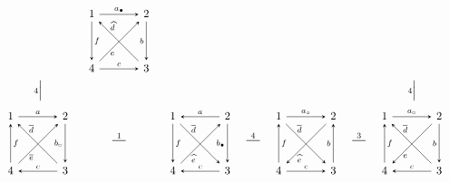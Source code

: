 \documentclass[11pt, letterpaper]{amsart}
\theoremstyle{definition}
\numberwithin{equation}{section}
\newcommand{\shortmutation}[1]{\stackrel{#1}{\rule[.5ex]{1.2em}{0.5pt}}}
\newcommand{\vmutation}[1]{  {\scriptstyle #1}{\Bigl|\Bigr.}  }
\def\ssquare{\scalebox{.75}{$\scriptscriptstyle\Box$}}
\begin{document}
\begin{figure}[ht]
\begin{equation*}
\begin{array}{ccccccccc}
&  
\begin{tikzcd}[arrows={-stealth}, sep=\sepps]
  1  \arrow[r,  "a_\bullet", -stealth] \arrow[dr, "\widehat{d}", near start, outer sep=\outsepd, stealth-]  \arrow[d, "f", -stealth]  
  & 2  \arrow[d, swap, "b",-stealth] \arrow[dl, "e", near end, outer sep=\outsepe,stealth-]
  \\
   4 
   & 3  \arrow[l, "c", swap, stealth-] 
\end{tikzcd}
 & \\ 
\\[-8pt]
\vmutation{4}   & & & & & & \vmutation{4} \\[-6pt]
\\
\begin{tikzcd}[arrows={-stealth}, sep=\sepps]
  1  \arrow[r,  "a", -stealth] \arrow[dr, "\overline{d}", near start, outer sep=\outsepd, stealth-]  \arrow[d, "f", stealth-]  
  & 2  \arrow[d, swap, "b_{\ssquare}",-stealth] \arrow[dl, "\overline{e}", near end, outer sep=\outsepe,stealth-]
  \\
   4 
   & 3  \arrow[l, "c", swap, -stealth] 
\end{tikzcd}
& \shortmutation 1
& 
\begin{tikzcd}[arrows={-stealth}, sep=\sepps]
  1  \arrow[r,  "a", stealth-] \arrow[dr, "\overline{d}", near start, outer sep=\outsepd, -stealth]  \arrow[d, "f", -stealth]  
  & 2  \arrow[d, swap, "b_\bullet",-stealth] \arrow[dl, "\widehat{e}", near end, outer sep=\outsepe,stealth-]
  \\
   4 
   & 3  \arrow[l, "c", swap, -stealth] 
\end{tikzcd}
& \shortmutation 4 
&  
\begin{tikzcd}[arrows={-stealth}, sep=\sepps]
  1  \arrow[r,  "a_\circ", -stealth] \arrow[dr, "\overline{d}", near start, outer sep=\outsepd, -stealth]  \arrow[d, "f", stealth-]  
  & 2  \arrow[d, swap, "b",stealth-] \arrow[dl, "\widehat{e}", near end, outer sep=\outsepe,-stealth]
  \\
   4 
   & 3  \arrow[l, "c", swap, stealth-] 
\end{tikzcd}
& \shortmutation 3 
&  
\begin{tikzcd}[arrows={-stealth}, sep=\sepps]
  1  \arrow[r,  "a_{\ssquare}", -stealth] \arrow[dr, "\overline{d}", near start, outer sep=\outsepd, stealth-]  \arrow[d, "f", stealth-]  
  & 2  \arrow[d, swap, "b",-stealth] \arrow[dl, "e", near end, outer sep=\outsepe,-stealth]
  \\
   4 
   & 3  \arrow[l, "c", swap, -stealth] 
\end{tikzcd}

\end{array}
\end{equation*}
\end{figure}
\end{document}
